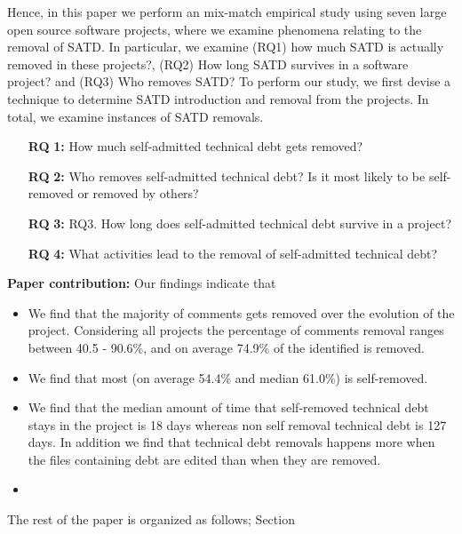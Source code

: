 Hence, in this paper we perform an mix-match empirical study using seven large open source software projects, where we examine phenomena relating to the removal of SATD. In particular, we examine (RQ1) how much SATD is actually removed in these projects?, (RQ2) How long SATD survives in a software project? and (RQ3) Who removes SATD? To perform our study, we first devise a technique to determine SATD introduction and removal from the projects. In total, we examine  instances of SATD removals.
\begin{itemize}
	\item[\textbf{RQ}]\textbf{1:} How much self-admitted technical debt gets removed?
	\item[\textbf{RQ}]\textbf{2:} Who removes self-admitted technical debt? Is it most likely to be self-removed or removed by others?
	\item[\textbf{RQ}]\textbf{3:} RQ3. How long does self-admitted technical debt survive in a project?
	\item[\textbf{RQ}]\textbf{4:} What activities lead to the removal of self-admitted technical debt?
	
\end{itemize}

\textbf{Paper contribution:} Our findings indicate that 
\begin{itemize}
	\item We find that the majority of \SATD comments gets removed over the evolution of the project. Considering all projects the percentage of \SATD comments removal ranges between 40.5 - 90.6\%, and on average 74.9\% of the identified \SATD is removed.
	\item We find that most \SATD (on average 54.4\% and median 61.0\%) is self-removed.
	\item We find that the median amount of time that self-removed technical debt stays in the project is 18 days whereas non self removal technical debt is 127 days. In addition we find that technical debt removals happens more when the files containing debt are edited than when they are removed.
	\item
\end{itemize}

The rest of the paper is organized as follows; Section 





